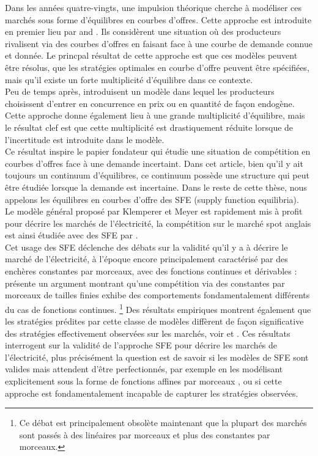 Dans les années quatre-vingts, une impulsion théorique cherche à modéliser ces marchés sous forme d'équilibres en courbes d'offres. Cette approche est introduite en premier lieu par \cite{grossman1981nash} and \cite{hart1982imperfect}. Ils considèrent une situation où des producteurs rivalisent via des courbes d'offres en faisant face à une courbe de demande connue et donnée. Le princpal résultat de cette approche est que ces modèles peuvent être résolus, que les stratégies optimales en courbe d'offre peuvent être spécifiées, mais qu'il existe un forte multiplicité d'équilibre dans ce contexte.\\

Peu de temps après, \cite{klemperer1986price} introduisent un modèle dans lequel les producteurs choisissent d'entrer en concurrence en prix ou en quantité de façon endogène. Cette approche donne également lieu à une grande multiplicité d'équilibre, mais le résultat clef est que cette multiplicité est drastiquement réduite lorsque de l'incertitude est introduite dans le modèle.\\

Ce résultat inspire le papier fondateur \cite{KM} qui étudie une situation de compétition en courbes d'offres face à une demande incertaint. Dans cet article, bien qu'il y ait toujours un continuum d'équilibres, ce continuum possède une structure qui peut être étudiée lorsque la demande est incertaine. Dans le reste de cette thèse, nous appelons les équilibres en courbes d'offre des SFE (supply function equilibria).\\

Le modèle général proposé par Klemperer et Meyer est rapidement mis à profit pour décrire les marchés de l'électricité, la compétition sur le marché spot anglais est ainsi étudiée avec des SFE par \cite{Newgreen}.\\

Cet usage des SFE déclenche des débats sur la validité qu'il y a à décrire le marché de l'électricité, à l'époque encore principalement caractérisé par des enchères constantes par morceaux, avec des fonctions continues et dérivables : \cite{von1993spot} présente un argument montrant qu'une compétition via des constantes par morceaux de tailles finies exhibe des comportements fondamentalement différents du cas de fonctions continues. \footnote{Ce débat est principalement obsolète maintenant que la plupart des marchés sont passés à des linéaires par morceaux et plus des constantes par morceaux.} Des résultats empiriques montrent également que les stratégies prédites par cette classe de modèles diffèrent de façon significative des stratégies effectivement observées sur les marchés, voir \cite{willems2009cournot} et \cite{willems2009cournot}. Ces résultats interrogent sur la validité de l'approche SFE pour décrire les marchés de l'électricité, plus précisément la question est de savoir si les modèles de SFE sont valides mais attendent d'être perfectionnés, par exemple en les modélisant explicitement sous la forme de fonctions affines par morceaux \cite{baldick2004theory}, ou si cette approche est fondamentalement incapable de capturer les stratégies observées.\\

